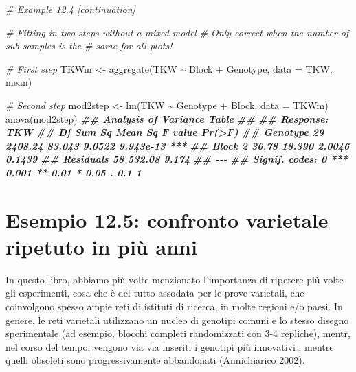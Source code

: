\documentclass[
  12pt,
]{book}
\newenvironment{Shaded}{\begin{snugshade}}{\end{snugshade}}
\newcommand{\AttributeTok}[1]{\textcolor[rgb]{0.77,0.63,0.00}{#1}}
\newcommand{\CommentTok}[1]{\textcolor[rgb]{0.56,0.35,0.01}{\textit{#1}}}
\newcommand{\DocumentationTok}[1]{\textcolor[rgb]{0.56,0.35,0.01}{\textbf{\textit{#1}}}}
\newcommand{\FunctionTok}[1]{\textcolor[rgb]{0.00,0.00,0.00}{#1}}
\newcommand{\NormalTok}[1]{#1}
\newcommand{\OtherTok}[1]{\textcolor[rgb]{0.56,0.35,0.01}{#1}}
\newcommand{\SpecialCharTok}[1]{\textcolor[rgb]{0.00,0.00,0.00}{#1}}
\begin{document}
\begin{Shaded}
\begin{Highlighting}[]
\CommentTok{\# Example 12.4 [continuation]}

\CommentTok{\# Fitting in two{-}steps without a mixed model}
\CommentTok{\# Only correct when the number of sub{-}samples is the}
\CommentTok{\# same for all plots!}

\CommentTok{\# First step}
\NormalTok{TKWm }\OtherTok{\textless{}{-}} \FunctionTok{aggregate}\NormalTok{(TKW }\SpecialCharTok{\textasciitilde{}}\NormalTok{ Block }\SpecialCharTok{+}\NormalTok{ Genotype, }\AttributeTok{data =}\NormalTok{ TKW, mean)}

\CommentTok{\# Second step}
\NormalTok{mod2step }\OtherTok{\textless{}{-}} \FunctionTok{lm}\NormalTok{(TKW }\SpecialCharTok{\textasciitilde{}}\NormalTok{ Genotype }\SpecialCharTok{+}\NormalTok{ Block, }\AttributeTok{data =}\NormalTok{ TKWm)}
\FunctionTok{anova}\NormalTok{(mod2step)}
\DocumentationTok{\#\# Analysis of Variance Table}
\DocumentationTok{\#\# }
\DocumentationTok{\#\# Response: TKW}
\DocumentationTok{\#\#           Df  Sum Sq Mean Sq F value    Pr(\textgreater{}F)    }
\DocumentationTok{\#\# Genotype  29 2408.24  83.043  9.0522 9.943e{-}13 ***}
\DocumentationTok{\#\# Block      2   36.78  18.390  2.0046    0.1439    }
\DocumentationTok{\#\# Residuals 58  532.08   9.174                      }
\DocumentationTok{\#\# {-}{-}{-}}
\DocumentationTok{\#\# Signif. codes:  0 \textquotesingle{}***\textquotesingle{} 0.001 \textquotesingle{}**\textquotesingle{} 0.01 \textquotesingle{}*\textquotesingle{} 0.05 \textquotesingle{}.\textquotesingle{} 0.1 \textquotesingle{} \textquotesingle{} 1}
\end{Highlighting}
\end{Shaded}

\hypertarget{esempio-12.5-confronto-varietale-ripetuto-in-piuxf9-anni}{%
\section{Esempio 12.5: confronto varietale ripetuto in più anni}\label{esempio-12.5-confronto-varietale-ripetuto-in-piuxf9-anni}}

In questo libro, abbiamo più volte menzionato l'importanza di ripetere più volte gli esperimenti, cosa che è del tutto assodata per le prove varietali, che coinvolgono spesso ampie reti di istituti di ricerca, in molte regioni e/o paesi. In genere, le reti varietali utilizzano un nucleo di genotipi comuni e lo stesso disegno sperimentale (ad esempio, blocchi completi randomizzati con 3-4 repliche), mentr, nel corso del tempo, vengono via via inseriti i genotipi più innovativi , mentre quelli obsoleti sono progressivamente abbandonati (Annichiarico 2002).
\end{document}

